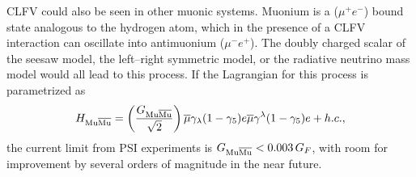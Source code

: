 CLFV could also be seen in other muonic systems.  Muonium is a  ($\mu^+ e^-$) bound state   analogous to the hydrogen atom, which
in the presence of a CLFV interaction can oscillate into antimuonium
($\mu^-e^+$).  The doubly charged scalar of the seesaw model, the left--right
symmetric model, or the radiative neutrino mass model would all lead to
this process.  If
the Lagrangian for this process is parametrized as
\begin{equation}
H_{\rm Mu\overline{Mu}} = \left({G_{\rm Mu\overline{Mu}} \over
\sqrt{2}} \right)
\overline{\mu}\gamma_{\lambda}(1-\gamma_5){e}
\overline{\mu}\gamma^{\lambda}(1-\gamma_5){e} + h.c.,
\end{equation}
the current limit from PSI experiments is $G_{\rm Mu\overline{Mu}} < 0.003
\,G_F$, with room for improvement by several orders of magnitude in
the near future.




